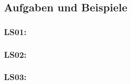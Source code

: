 \subsection{Aufgaben und Beispiele}

\subsubsection{LS01: }

\subsubsection{LS02: }

\subsubsection{LS03: }

